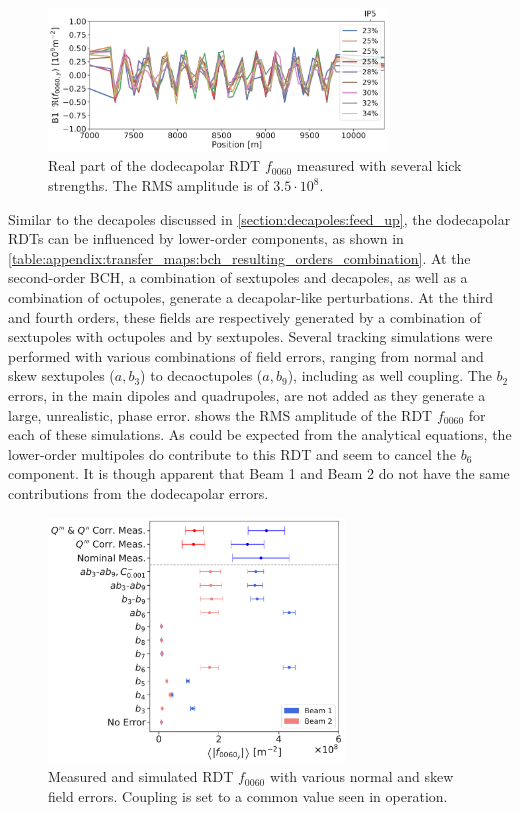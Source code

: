 \begin{figure}[!htb]
    \centering
    \includegraphics[width=0.8\textwidth]{./images/f0060y_all_meas_real.pdf}
    \caption{Real part of the dodecapolar RDT $f_{0060}$ measured with several kick strengths. The
    RMS amplitude is of $3.5\cdot10^{8}$.}
    \label{fig:high_orders:dodecapolar_f0060}
\end{figure}

Similar to the decapoles discussed in \cref{section:decapoles:feed_up}, the dodecapolar RDTs can be
influenced by lower-order components, as shown in
\cref{table:appendix:transfer_maps:bch_resulting_orders_combination}. At the second-order BCH, a
combination of sextupoles and decapoles, as well as a combination of octupoles, generate a
decapolar-like perturbations. At the third and fourth orders, these fields are respectively
generated by a combination of sextupoles with octupoles and by sextupoles.  
Several tracking simulations were performed with various combinations of field errors, ranging from
normal and skew sextupoles ($a,b_3$) to decaoctupoles ($a,b_9$), including as well coupling.
The $b_2$ errors, in the main dipoles and quadrupoles, are not added as they generate a large,
unrealistic, phase error.
 shows the RMS amplitude of the RDT $f_{0060}$ for each of
these simulations. As could be expected from the analytical equations, the lower-order multipoles do
contribute to this RDT and seem to cancel the $b_6$ component. It is though apparent that Beam 1 and
Beam 2 do not have the same contributions from the dodecapolar errors. 


\begin{figure}[!htb]
    \centering
    \includegraphics[width=0.7\textwidth]{./images/simulations_f0060.pdf}
    \caption{Measured and simulated RDT $f_{0060}$ with various normal and skew field errors.
    Coupling is set to a common value seen in operation.}
    \label{fig:high_orders:simulations_f0060}
\end{figure}

